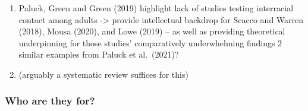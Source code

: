 \documentclass[
  man]{apa6}
\providecommand{\tightlist}{%
  \setlength{\itemsep}{0pt}\setlength{\parskip}{0pt}}
\begin{document}
\begin{enumerate}
\begin{enumerate}
    \begin{enumerate}
    \def\labelenumiii{\arabic{enumiii}.}
    \tightlist
    \item
      Paluck, Green and Green (2019) highlight lack of studies testing interracial contact among adults -\textgreater{} provide intellectual backdrop for Scacco and Warren (2018), Mousa (2020), and Lowe (2019) -- as well as providing theoretical underpinning for those studies' comparatively underwhelming findings
      2 similar examples from Paluck et al.~(2021)?
    \item
      (arguably a systematic review suffices for this)
    \end{enumerate}
  \end{enumerate}
\end{enumerate}

\subsubsection{Who are they for?}\label{who-are-they-for}
\end{document}
